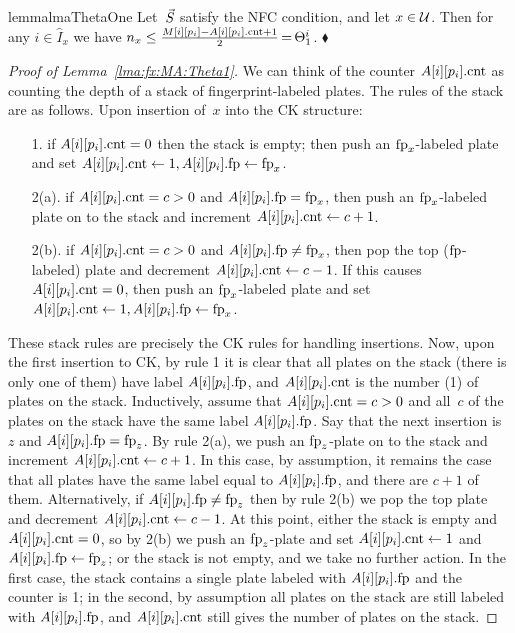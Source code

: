 \begin{restatable}{lemma}{lmaThetaOne}\label{lma:fx:MA:Theta1}
	Let~$\vec{S}$ satisfy the NFC condition, and let $x \in \mathcal{U}$.  Then for any $i \in \hat{I}_x$ we have
	$n_x \leq \frac{M[i][p_i] - A[i][p_i].\textup{cnt} +1}{2}\,{=}\,\Theta^i_1$.
	\hfill$\blacklozenge$
\end{restatable}

\begin{proof}[Proof of Lemma~\ref{lma:fx:MA:Theta1}]
    We can think of the counter $A[i][p_i].\textup{cnt}$ as counting the depth of a stack of fingerprint-labeled plates.  The rules of the stack are as follows.  Upon insertion of~$x$ into the CK structure: 
    \begin{enumerate}
        \item[1.] if $A[i][p_i].\textup{cnt}=0$ then the stack is empty; then push an $\textup{fp}_x$-labeled plate and set $A[i][p_i].\textup{cnt} \gets 1, A[i][p_i].\textup{fp} \gets\textup{fp}_x$.
        \item[2(a).] if $A[i][p_i].\textup{cnt}=c>0$ and $A[i][p_i].\textup{fp} =\textup{fp}_x$, then push an $\textup{fp}_x$-labeled plate on to the stack and increment $A[i][p_i].\textup{cnt} \gets c+1$.
        \item[2(b).]if $A[i][p_i].\textup{cnt}=c > 0$ and $A[i][p_i].\textup{fp} \neq \textup{fp}_x$, then pop the top ($\textup{fp}$-labeled) plate and decrement $A[i][p_i].\textup{cnt} \gets c-1$.  If this causes $A[i][p_i].\textup{cnt}=0$, then push an $\textup{fp}_x$-labeled plate and set $A[i][p_i].\textup{cnt}\gets 1, A[i][p_i].\textup{fp} \gets \textup{fp}_x$.
    \end{enumerate}
    These stack rules are precisely the CK rules for handling insertions.  Now, upon the first insertion to CK, by rule 1 it is clear that all plates on the stack (there is only one of them) have label $A[i][p_i].\textup{fp}$, and $A[i][p_i].\textup{cnt}$ is the number (1) of plates on the stack.  Inductively, assume that $A[i][p_i].\textup{cnt}=c>0$ and all~$c$ of the 
    plates on the stack have the same label $A[i][p_i].\textup{fp}$.  Say that the next insertion is~$z$ and $A[i][p_i].\textup{fp}=\textup{fp}_z$.  By rule 2(a), we push an $\textup{fp}_z$-plate on to the stack and increment $A[i][p_i].\textup{cnt} \gets c+1$.  In this case, by assumption, it remains the case that all 
    plates have the same label equal to $A[i][p_i].\textup{fp}$, and there are $c+1$ of them. Alternatively, if $ A[i][p_i].\textup{fp} \neq \textup{fp}_z$ then by rule 2(b) we pop the top plate and decrement $A[i][p_i].\textup{cnt} \gets c -1$.  At this point, either the stack is empty and $A[i][p_i].\textup{cnt}=0$, 
    so by 2(b) we push an $\textup{fp}_z$-plate and set $A[i][p_i].\textup{cnt} \gets 1$ and $A[i][p_i].\textup{fp} \gets \textup{fp}_z$; or the stack is not empty, and we take no further action.  In the first case, the stack contains a single plate labeled with $A[i][p_i].\textup{fp}$ and the 
    counter is 1; in the second, by assumption all plates on the stack are still labeled with  $A[i][p_i].\textup{fp}$, and $A[i][p_i].\textup{cnt}$ still gives the number of plates on the stack.
    

\end{proof}

